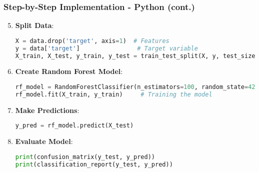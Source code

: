 \documentclass[aspectratio=169]{beamer}
\begin{document}
\begin{frame}[fragile]
    \frametitle{Step-by-Step Implementation - Python (cont.)}
    \begin{enumerate}
        \setcounter{enumi}{4}
        \item \textbf{Split Data}:
            \begin{lstlisting}[language=Python]
X = data.drop('target', axis=1)  # Features
y = data['target']                # Target variable
X_train, X_test, y_train, y_test = train_test_split(X, y, test_size=0.2, random_state=42)
            \end{lstlisting}

        \item \textbf{Create Random Forest Model}:
            \begin{lstlisting}[language=Python]
rf_model = RandomForestClassifier(n_estimators=100, random_state=42)
rf_model.fit(X_train, y_train)     # Training the model
            \end{lstlisting}

        \item \textbf{Make Predictions}:
            \begin{lstlisting}[language=Python]
y_pred = rf_model.predict(X_test)
            \end{lstlisting}

        \item \textbf{Evaluate Model}:
            \begin{lstlisting}[language=Python]
print(confusion_matrix(y_test, y_pred))
print(classification_report(y_test, y_pred))
            \end{lstlisting}
    \end{enumerate}
\end{frame}
\end{document}
